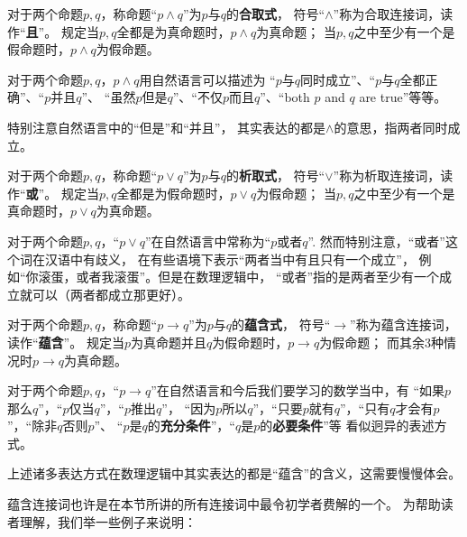 \begin{definition}[合取连接词]
对于两个命题$p,q$，称命题“$p\wedge q$”为$p$与$q$的\textbf{合取式}，
符号“$\wedge$”称为合取连接词，读作“\textbf{且}”。
规定当$p,q$全都是为真命题时，$p\wedge q$为真命题；
当$p,q$之中至少有一个是假命题时，$p\wedge q$为假命题。
\end{definition}
对于两个命题$p,q$，$p\wedge q$用自然语言可以描述为
“$p$与$q$同时成立”、“$p$与$q$全都正确”、“$p$并且$q$”、
“虽然$p$但是$q$”、“不仅$p$而且$q$”、“both $p$ and $q$ are true”等等。

特别注意自然语言中的“但是”和“并且”，
其实表达的都是$\wedge$的意思，指两者同时成立。

\begin{definition}[析取连接词]
对于两个命题$p,q$，称命题“$p\vee q$”为$p$与$q$的\textbf{析取式}，
符号“$\vee$”称为析取连接词，读作“\textbf{或}”。
规定当$p,q$全都是为假命题时，$p\vee q$为假命题；
当$p,q$之中至少有一个是真命题时，$p\vee q$为真命题。
\end{definition}
对于两个命题$p,q$，“$p\vee q$”在自然语言中常称为“$p$或者$q$”.
然而特别注意，“或者”这个词在汉语中有歧义，
在有些语境下表示“两者当中有且只有一个成立”，
例如“你滚蛋，或者我滚蛋”。但是在数理逻辑中，
“或者”指的是两者至少有一个成立就可以（两者都成立那更好）。

\begin{definition}[蕴含连接词]
对于两个命题$p,q$，称命题“$p\rightarrow q$”为$p$与$q$的\textbf{蕴含式}，
符号“$\rightarrow$”称为蕴含连接词，读作“\textbf{蕴含}”。
规定当$p$为真命题并且$q$为假命题时，$p\rightarrow q$为假命题；
而其余3种情况时$p\rightarrow q$为真命题。
\end{definition}

对于两个命题$p,q$，“$p\rightarrow q$”在自然语言和今后我们要学习的数学当中，有
“如果$p$那么$q$”，“$p$仅当$q$”，“$p$推出$q$”，
“因为$p$所以$q$”，“只要$p$就有$q$”，“只有$q$才会有$p$”，“除非$q$否则$p$”、
“$p$是$q$的\textbf{充分条件}”，“$q$是$p$的\textbf{必要条件}”等
看似迥异的表述方式。

上述诸多表达方式在数理逻辑中其实表达的都是“蕴含”的含义，这需要慢慢体会。

蕴含连接词也许是在本节所讲的所有连接词中最令初学者费解的一个。
为帮助读者理解，我们举一些例子来说明：

